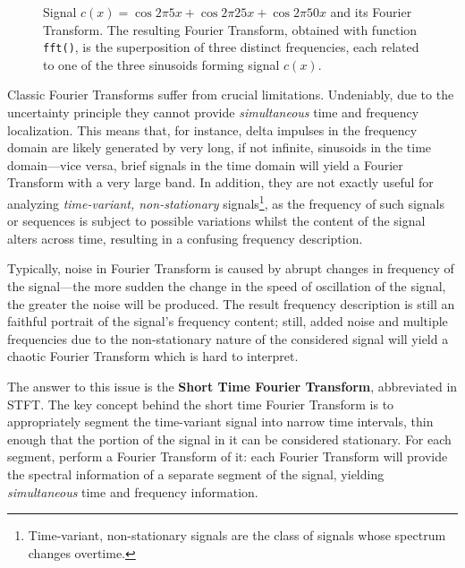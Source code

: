 \documentclass[\documentfontsize, twocolumn]{\classname}
\begin{document}
\begin{figure*}[ht]
\begin{center}
\scalebox{0.5}{

    }\caption{Signal $c(x) = \cos{2\pi 5 x} + \cos{2\pi 25 x} + \cos{2\pi 50x}$
    and its Fourier Transform. The resulting Fourier Transform, obtained with
    function \texttt{fft()}, is the superposition of three distinct
    frequencies, each related to one of the three sinusoids forming signal
    $c(x)$.}\label{oct:cosineSumFT}
\end{center}
\end{figure*}

Classic Fourier Transforms suffer from crucial limitations. Undeniably, due to the uncertainty principle they cannot provide \emph{simultaneous} time and frequency localization. This means that, for instance, delta impulses in the frequency domain are likely generated by very long, if not infinite, sinusoids in the time domain---vice versa, brief signals in the time domain will yield a Fourier Transform with a very large band. In addition, they are not exactly useful for analyzing \emph{time-variant, non-stationary} signals\footnote{ Time-variant, non-stationary signals are the class of signals whose spectrum changes overtime.}, as the frequency of such signals or sequences is subject to possible variations whilst the content of the signal alters across time, resulting in a confusing frequency description.

Typically, noise in Fourier Transform is caused by abrupt changes in frequency of the signal---the more sudden the change in the speed of oscillation of the signal, the greater the noise will be produced. The result frequency description is still an faithful portrait of the signal's frequency content; still, added noise and multiple frequencies due to the non-stationary nature of the considered signal will yield a chaotic Fourier Transform which is hard to interpret.

The answer to this issue is the \textbf{Short Time Fourier Transform}, abbreviated in STFT. The key concept behind the short time Fourier Transform is to appropriately segment the time-variant signal into narrow time intervals, thin enough that the portion of the signal in it can be considered stationary. For each segment, perform a Fourier Transform of it: each Fourier Transform will provide the spectral information of a separate segment of the signal, yielding \emph{simultaneous} time and frequency information.
\end{document}
